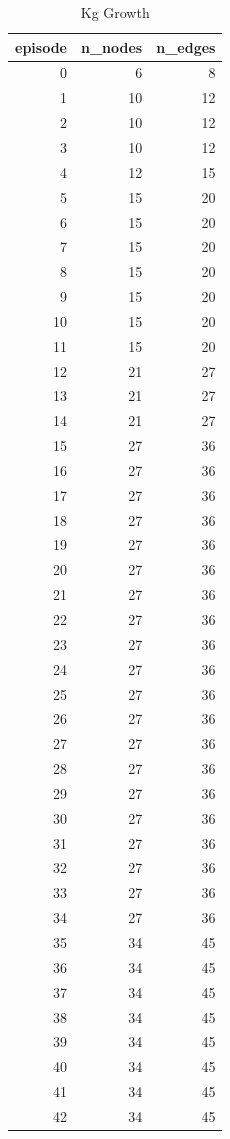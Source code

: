 \begin{table}
\caption{Kg Growth}
\label{tab:kg_growth}
\begin{tabular}{rrr}
\toprule
episode & n_nodes & n_edges \\
\midrule
0 & 6 & 8 \\
1 & 10 & 12 \\
2 & 10 & 12 \\
3 & 10 & 12 \\
4 & 12 & 15 \\
5 & 15 & 20 \\
6 & 15 & 20 \\
7 & 15 & 20 \\
8 & 15 & 20 \\
9 & 15 & 20 \\
10 & 15 & 20 \\
11 & 15 & 20 \\
12 & 21 & 27 \\
13 & 21 & 27 \\
14 & 21 & 27 \\
15 & 27 & 36 \\
16 & 27 & 36 \\
17 & 27 & 36 \\
18 & 27 & 36 \\
19 & 27 & 36 \\
20 & 27 & 36 \\
21 & 27 & 36 \\
22 & 27 & 36 \\
23 & 27 & 36 \\
24 & 27 & 36 \\
25 & 27 & 36 \\
26 & 27 & 36 \\
27 & 27 & 36 \\
28 & 27 & 36 \\
29 & 27 & 36 \\
30 & 27 & 36 \\
31 & 27 & 36 \\
32 & 27 & 36 \\
33 & 27 & 36 \\
34 & 27 & 36 \\
35 & 34 & 45 \\
36 & 34 & 45 \\
37 & 34 & 45 \\
38 & 34 & 45 \\
39 & 34 & 45 \\
40 & 34 & 45 \\
41 & 34 & 45 \\
42 & 34 & 45 \\

\end{tabular}
\end{table}

